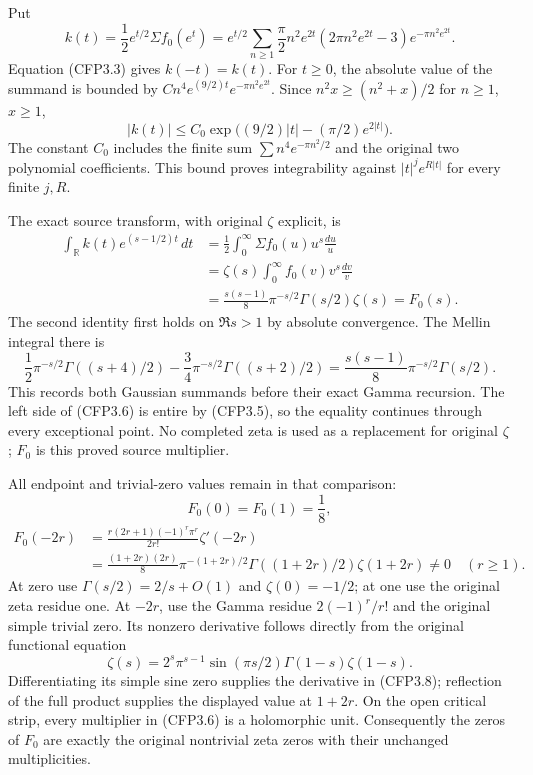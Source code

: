 Put \[
\boxed{k(t)=\frac12e^{t/2}\Sigma f_0(e^t)
=e^{t/2}\sum_{n\ge1}
\frac\pi2 n^2e^{2t}(2\pi n^2e^{2t}-3)
e^{-\pi n^2e^{2t}}.}
\tag{CFP3.4}
\] Equation (CFP3.3) gives \(k(-t)=k(t)\). For \(t\ge0\), the absolute
value of the summand is bounded by
\(C n^4e^{(9/2)t}e^{-\pi n^2e^{2t}}\). Since \(n^2x\ge(n^2+x)/2\) for
\(n\ge1\), \(x\ge1\), \[
|k(t)|\le C_0\exp\bigl((9/2)|t|-(\pi/2)e^{2|t|}\bigr).
\tag{CFP3.5}
\] The constant \(C_0\) includes the finite sum
\(\sum n^4e^{-\pi n^2/2}\) and the original two polynomial coefficients.
This bound proves integrability against \(|t|^j e^{R|t|}\) for every
finite \(j,R\).

The exact source transform, with original \(\zeta\) explicit, is \[
\begin{aligned}
\int_{\mathbb R}k(t)e^{(s-1/2)t}\,dt
&=\frac12\int_0^\infty\Sigma f_0(u)u^s\frac{du}{u}\\
&=\zeta(s)\int_0^\infty f_0(v)v^s\frac{dv}{v}\\
&=\boxed{\frac{s(s-1)}8\pi^{-s/2}\Gamma(s/2)\zeta(s)=F_0(s)}.
\end{aligned}
\tag{CFP3.6}
\] The second identity first holds on \(\Re s>1\) by absolute
convergence. The Mellin integral there is \[
\frac12\pi^{-s/2}\Gamma((s+4)/2)
-\frac34\pi^{-s/2}\Gamma((s+2)/2)
=\frac{s(s-1)}8\pi^{-s/2}\Gamma(s/2).
\tag{CFP3.7}
\] This records both Gaussian summands before their exact Gamma
recursion. The left side of (CFP3.6) is entire by (CFP3.5), so the
equality continues through every exceptional point. No completed zeta is
used as a replacement for original \(\zeta\); \(F_0\) is this proved
source multiplier.

All endpoint and trivial-zero values remain in that comparison: \[
F_0(0)=F_0(1)=\frac18,
\] \[
\begin{aligned}
F_0(-2r)&=\frac{r(2r+1)(-1)^r\pi^r}{2r!}\zeta'(-2r)
\\
&=\frac{(1+2r)(2r)}8\pi^{-(1+2r)/2}
\Gamma((1+2r)/2)\zeta(1+2r)\ne0\quad(r\ge1).
\end{aligned}
\tag{CFP3.8}
\] At zero use \(\Gamma(s/2)=2/s+O(1)\) and \(\zeta(0)=-1/2\); at one
use the original zeta residue one. At \(-2r\), use the Gamma residue
\(2(-1)^r/r!\) and the original simple trivial zero. Its nonzero
derivative follows directly from the original functional equation \[
\zeta(s)=2^s\pi^{s-1}\sin(\pi s/2)\Gamma(1-s)\zeta(1-s).
\tag{CFP3.9}
\] Differentiating its simple sine zero supplies the derivative in
(CFP3.8); reflection of the full product supplies the displayed value at
\(1+2r\). On the open critical strip, every multiplier in (CFP3.6) is a
holomorphic unit. Consequently the zeros of \(F_0\) are exactly the
original nontrivial zeta zeros with their unchanged multiplicities.

